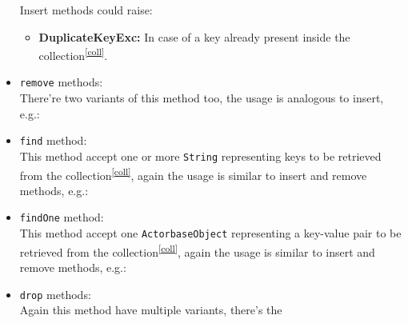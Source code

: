 \documentclass{scalatekids-article}
\begin{document}
\begin{itemize}
  Insert methods could raise:
  \begin{itemize}
  \item \textbf{DuplicateKeyExc:} In case of a key already present inside the collection\textsuperscript{\ref{coll}}.
  \end{itemize}
\item \verb=remove= methods:\\ There're two variants of this method too, the usage is
  analogous to insert, e.g.:
\item \verb=find= method:\\ This method accept one or more \verb=String= representing
  keys to be retrieved from the collection\textsuperscript{\ref{coll}}, again the usage is similar to insert and
  remove methods, e.g.:
\item \verb=findOne= method:\\ This method accept one \verb=ActorbaseObject= representing
  a key-value pair to be retrieved from the collection\textsuperscript{\ref{coll}}, again the usage is similar to insert and
  remove methods, e.g.:
\item \verb=drop= methods:\\ Again this method have multiple variants, there's the

\end{itemize}
\end{document}

